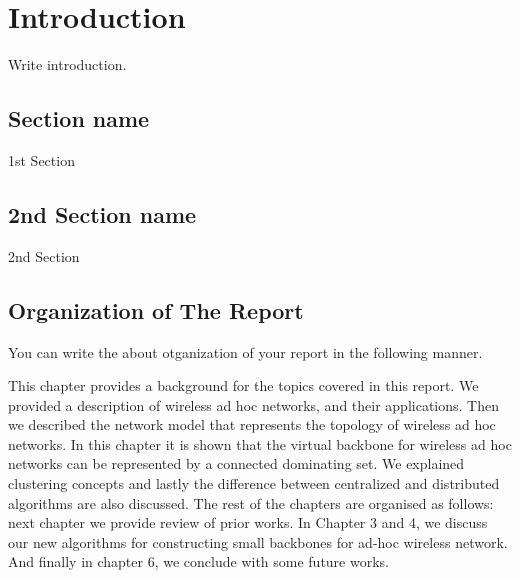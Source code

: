 \chapter{Introduction}
\hspace{3mm}

Write introduction.

\section{Section name}
1st Section

\section{2nd Section name}

2nd Section

\section{Organization of The Report}

You can write the about otganization of your report in the following manner.

This chapter provides a background for the topics covered in this
report. We provided a description of wireless ad hoc networks, and
their applications. Then we described the network model that
represents the topology of wireless ad hoc networks. In this
chapter it is shown that the virtual backbone for wireless ad hoc
networks can be represented by a connected dominating set. We
explained clustering concepts and lastly the difference between
centralized and distributed algorithms are also discussed. The
rest of the chapters are organised as follows: next chapter we
provide review of prior works. In Chapter 3 and 4, we discuss our
new algorithms for constructing small backbones for ad-hoc
wireless network. And finally in chapter 6, we conclude with some
future works.
